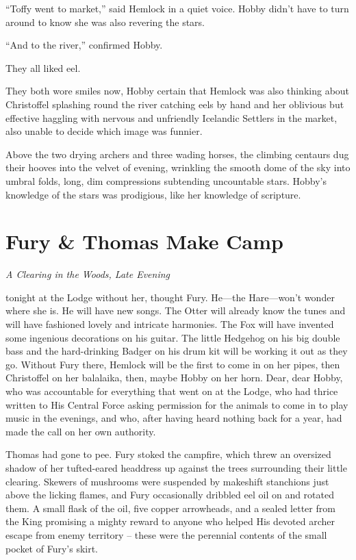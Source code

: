 \documentclass[11pt,a5paper]{article}
\newcommand{\alet}[1]{\textit{#1}\vspace{1em}}
\begin{document}
``Toffy went to market,'' said Hemlock in a quiet voice. Hobby didn't have to turn around to know she was also revering the stars.

``And to the river,'' confirmed Hobby.

They all liked eel.

They both wore smiles now, Hobby certain that Hemlock was also thinking about Christoffel splashing round the river catching eels by hand and her oblivious but effective haggling with nervous and unfriendly Icelandic Settlers in the market, also unable to decide which image was funnier.

Above the two drying archers and three wading horses, the climbing centaurs dug their hooves into the velvet of evening, wrinkling the smooth dome of the sky into umbral folds, long, dim compressions subtending uncountable stars. Hobby's knowledge of the stars was prodigious, like her knowledge of scripture.

\newpage

\section{Fury \& Thomas Make Camp}

\alet{A Clearing in the Woods, Late Evening}

 tonight at the Lodge without her, thought Fury. He---the Hare---won't wonder where she is. He will have new songs. The Otter will already know the tunes and will have fashioned lovely and intricate harmonies. The Fox will have invented some ingenious decorations on his guitar. The little Hedgehog on his big double bass and the hard-drinking Badger on his drum kit will be working it out as they go. Without Fury there, Hemlock will be the first to come in on her pipes, then Christoffel on her balalaika, then, maybe Hobby on her horn. Dear, dear Hobby, who was accountable for everything that went on at the Lodge, who had thrice written to His Central Force asking permission for the animals to come in to play music in the evenings, and who, after having heard nothing back for a year, had made the call on her own authority.

Thomas had gone to pee. Fury stoked the campfire, which threw an oversized shadow of her tufted-eared headdress up against the trees surrounding their little clearing. Skewers of mushrooms were suspended by makeshift stanchions just above the licking flames, and Fury occasionally dribbled eel oil on and rotated them. A small flask of the oil, five copper arrowheads, and a sealed letter from the King promising a mighty reward to anyone who helped His devoted archer escape from enemy territory -- these were the perennial contents of the small pocket of Fury's skirt.
\end{document}
